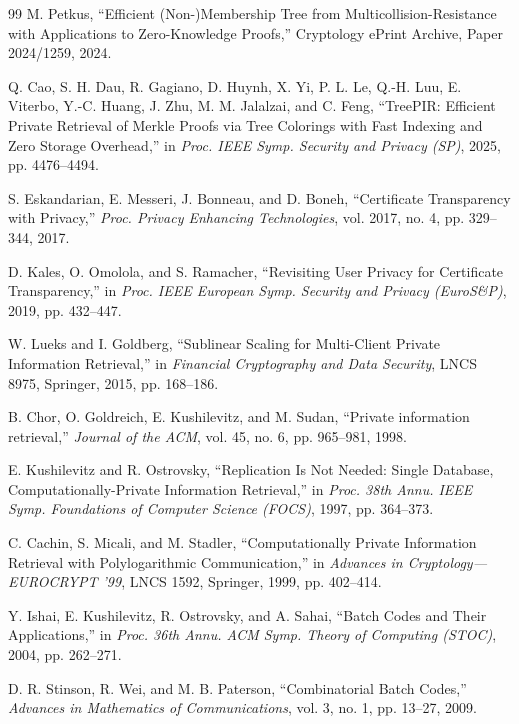 \begin{thebibliography}{99}
M. Petkus,
\newblock ``Efficient (Non-)Membership Tree from Multicollision-Resistance with Applications to Zero-Knowledge Proofs,''
\newblock Cryptology ePrint Archive, Paper 2024/1259, 2024.

Q. Cao, S. H. Dau, R. Gagiano, D. Huynh, X. Yi, P. L. Le, Q.-H. Luu, E. Viterbo, Y.-C. Huang, J. Zhu, M. M. Jalalzai, and C. Feng,
\newblock ``TreePIR: Efficient Private Retrieval of Merkle Proofs via Tree Colorings with Fast Indexing and Zero Storage Overhead,''
\newblock in \emph{Proc. IEEE Symp. Security and Privacy (SP)}, 2025, pp. 4476--4494.

S. Eskandarian, E. Messeri, J. Bonneau, and D. Boneh,
\newblock ``Certificate Transparency with Privacy,''
\newblock \emph{Proc. Privacy Enhancing Technologies}, vol. 2017, no. 4, pp. 329--344, 2017.

D. Kales, O. Omolola, and S. Ramacher,
\newblock ``Revisiting User Privacy for Certificate Transparency,''
\newblock in \emph{Proc. IEEE European Symp. Security and Privacy (EuroS\&P)}, 2019, pp. 432--447.

W. Lueks and I. Goldberg,
\newblock ``Sublinear Scaling for Multi-Client Private Information Retrieval,''
\newblock in \emph{Financial Cryptography and Data Security}, LNCS 8975, Springer, 2015, pp. 168--186.

B. Chor, O. Goldreich, E. Kushilevitz, and M. Sudan,
\newblock ``Private information retrieval,''
\newblock \emph{Journal of the ACM}, vol. 45, no. 6, pp. 965--981, 1998.

E. Kushilevitz and R. Ostrovsky,
\newblock ``Replication Is Not Needed: Single Database, Computationally-Private Information Retrieval,''
\newblock in \emph{Proc. 38th Annu. IEEE Symp. Foundations of Computer Science (FOCS)}, 1997, pp. 364--373.

C. Cachin, S. Micali, and M. Stadler,
\newblock ``Computationally Private Information Retrieval with Polylogarithmic Communication,''
\newblock in \emph{Advances in Cryptology---EUROCRYPT '99}, LNCS 1592, Springer, 1999, pp. 402--414.

Y. Ishai, E. Kushilevitz, R. Ostrovsky, and A. Sahai,
\newblock ``Batch Codes and Their Applications,''
\newblock in \emph{Proc. 36th Annu. ACM Symp. Theory of Computing (STOC)}, 2004, pp. 262--271.

D. R. Stinson, R. Wei, and M. B. Paterson,
\newblock ``Combinatorial Batch Codes,''
\newblock \emph{Advances in Mathematics of Communications}, vol. 3, no. 1, pp. 13--27, 2009.


\end{thebibliography}
